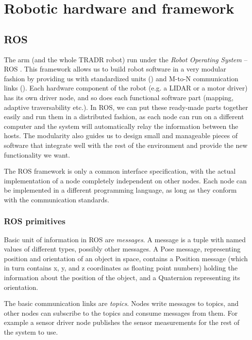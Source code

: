 \documentclass[buriama8_dp.tex]{subfiles}
\begin{document}
\chapter{Robotic hardware and framework}

\section{ROS}
\label{sec:ros}

The arm (and the whole TRADR robot) run under the \emph{Robot Operating System} – ROS \cite{ros_paper}. This framework allows us to build robot software in a very modular fashion by providing us with standardized units () and M-to-N communication links (). Each hardware component of the robot (e.g. a LIDAR or a motor driver) has its own driver node, and so does each functional software part (mapping, adaptive traversability etc.). In ROS, we can put these ready-made parts together easily and run them in a distributed fashion, as each node can run on a different computer and the system will automatically relay the information between the hosts. The modularity also guides us to design small and manageable pieces of software that integrate well with the rest of the environment and provide the new functionality we want.

The ROS framework is only a common interface specification, with the actual implementation of a node completely independent on other nodes. Each node can be implemented in a different programming language, as long as they conform with the communication standards.

\subsection{ROS primitives}
\label{subsec:ros_prims}

Basic unit of information in ROS are \emph{messages}. A message is a tuple with named values of different types, possibly other messages. A Pose message, representing position and orientation of an object in space, contains a Position message (which in turn contains \m x, \m y, and \m z coordinates as floating point numbers) holding the information about the position of the object, and a Quaternion representing its orientation.

The basic communication links are \emph{topics}. Nodes write messages to topics, and other nodes can subscribe to the topics and consume messages from them. For example a sensor driver node publishes the sensor measurements for the rest of the system to use.
\end{document}
